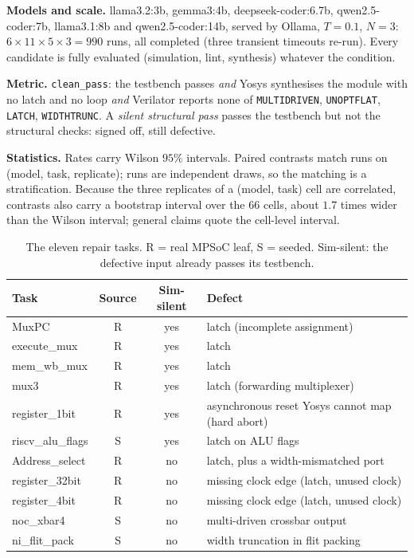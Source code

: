 \documentclass[11pt]{article}
\begin{document}
\textbf{Models and scale.} llama3.2:3b, gemma3:4b, deepseek-coder:6.7b,
qwen2.5-coder:7b, llama3.1:8b and qwen2.5-coder:14b, served by Ollama,
$T{=}0.1$, $N{=}3$: $6 \times 11 \times 5 \times 3 = 990$ runs, all
completed (three transient timeouts re-run). Every candidate is fully
evaluated (simulation, lint, synthesis) whatever the condition.

\textbf{Metric.} \texttt{clean\_pass}: the testbench passes \emph{and} Yosys
synthesises the module with no latch and no loop \emph{and} Verilator reports
none of \texttt{MULTIDRIVEN}, \texttt{UNOPTFLAT}, \texttt{LATCH},
\texttt{WIDTHTRUNC}. A \emph{silent structural pass} passes the testbench but
not the structural checks: signed off, still defective.

\textbf{Statistics.} Rates carry Wilson $95\%$ intervals. Paired contrasts
match runs on (model, task, replicate); runs are independent draws, so the
matching is a stratification. Because the three replicates of a (model, task)
cell are correlated, contrasts also carry a bootstrap interval over the $66$
cells, about $1.7$ times wider than the Wilson interval; general claims quote
the cell-level interval.

\begin{table}[htbp]
\centering
\caption{The eleven repair tasks. R = real MPSoC leaf, S = seeded.
Sim-silent: the defective input already passes its testbench.}
\label{tab:tasks}
\small
\begin{tabularx}{\linewidth}{@{} l c c X @{}}
\toprule
\textbf{Task} & \textbf{Source} & \textbf{Sim-silent} & \textbf{Defect} \\
\midrule
MuxPC            & R & yes & latch (incomplete assignment) \\
execute\_mux     & R & yes & latch \\
mem\_wb\_mux     & R & yes & latch \\
mux3             & R & yes & latch (forwarding multiplexer) \\
register\_1bit   & R & yes & asynchronous reset Yosys cannot map (hard abort) \\
riscv\_alu\_flags & S & yes & latch on ALU flags \\
Address\_select  & R & no  & latch, plus a width-mismatched port \\
register\_32bit  & R & no  & missing clock edge (latch, unused clock) \\
register\_4bit   & R & no  & missing clock edge (latch, unused clock) \\
noc\_xbar4       & S & no  & multi-driven crossbar output \\
ni\_flit\_pack   & S & no  & width truncation in flit packing \\
\bottomrule
\end{tabularx}
\end{table}
\end{document}
